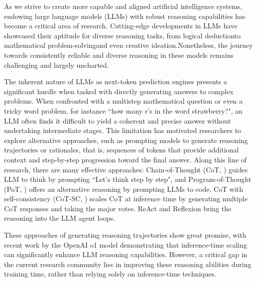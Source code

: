 As we strive to create more capable and aligned artificial intelligence systems, endowing large language models (LLMs) with robust reasoning capabilities has become a critical area of research. Cutting-edge developments in LLMs have showcased their aptitude for diverse reasoning tasks, from logical deduction\needscitation to mathematical problem-solving\needscitation and even creative ideation.\needscitation Nonetheless, the journey towards consistently reliable and diverse reasoning in these models remains challenging and largely uncharted.

The inherent nature of LLMs as next-token prediction engines presents a significant hurdle when tasked with directly generating answers to complex problems. When confronted with a multistep mathematical question or even a tricky word problem, for instance ``how many r's in the word strawberry?", an LLM often finds it difficult to yield a coherent and precise answer without undertaking intermediate stages. This limitation has motivated researchers to explore alternative approaches, such as prompting models to generate reasoning trajectories or rationales, that is, sequences of tokens that provide additional context and step-by-step progression toward the final answer. Along this line of research, there are many effective approaches: Chain-of-Thought (CoT, \citet{DBLP:conf/nips/Wei0SBIXCLZ22}) guides LLM to think by prompting ``Let's think step by step", and Program-of-Thought (PoT, \citet{DBLP:journals/tmlr/ChenM0C23}) offers an alternative reasoning by prompting LLMs to code. CoT with self-consistency (CoT-SC, \citet{DBLP:conf/iclr/0002WSLCNCZ23}) scales CoT at inference time by generating multiple CoT responses and taking the major votes. ReAct \citep{DBLP:conf/iclr/YaoZYDSN023} and Reflexion \citep{DBLP:conf/nips/ShinnCGNY23} bring the reasoning into the LLM agent loops.

These approaches of generating reasoning trajectories show great promise, with recent work by the OpenAI o1 model \citep{openai_learning_2024} demonstrating that inference-time scaling can significantly enhance LLM reasoning capabilities. However, a critical gap in the current research community lies in improving these reasoning abilities during training time, rather than relying solely on inference-time techniques.

